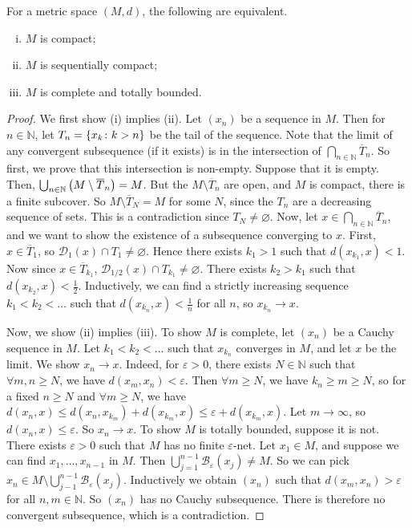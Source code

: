 \begin{theorem}
	For a metric space \( (M, d) \), the following are equivalent.
	\begin{enumerate}[(i)]
		\item \( M \) is compact;
		\item \( M \) is sequentially compact;
		\item \( M \) is complete and totally bounded.
	\end{enumerate}
\end{theorem}
\begin{proof}
	We first show (i) implies (ii).
	Let \( (x_n) \) be a sequence in \( M \).
	Then for \( n \in \mathbb N \), let \( T_n = \qty{x_k \colon k > n} \) be the tail of the sequence.
	Note that the limit of any convergent subsequence (if it exists) is in the intersection of \( \bigcap_{n \in \mathbb N} \overline T_n \).
	So first, we prove that this intersection is non-empty.
	Suppose that it is empty.
	Then, \( \bigcup_{n \in \mathbb N} \qty(M \setminus \overline T_n) = M \).
	But the \( M \setminus \overline T_n \) are open, and \( M \) is compact, there is a finite subcover.
	So \( M \setminus \overline T_N = M \) for some \( N \), since the \( T_n \) are a decreasing sequence of sets.
	This is a contradiction since \( T_N \neq \varnothing \).
	Now, let \( x \in \bigcap_{n \in \mathbb N} \overline T_n \), and we want to show the existence of a subsequence converging to \( x \).
	First, \( x \in \overline T_1 \), so \( \mathcal D_1(x) \cap T_1 \neq \varnothing \).
	Hence there exists \( k_1 > 1 \) such that \( d(x_{k_1}, x) < 1 \).
	Now since \( x \in \overline T_{k_1} \), \( \mathcal D_{1/2}(x) \cap T_{k_1} \neq \varnothing \).
	There exists \( k_2 > k_1 \) such that \( d(x_{k_2}, x) < \frac{1}{2} \).
	Inductively, we can find a strictly increasing sequence \( k_1 < k_2 < \dots \) such that \( d(x_{k_n}, x) < \frac{1}{n} \) for all \( n \), so \( x_{k_n} \to x \).

	Now, we show (ii) implies (iii).
	To show \( M \) is complete, let \( (x_n) \) be a Cauchy sequence in \( M \).
	Let \( k_1 < k_2 < \dots \) such that \( x_{k_n} \) converges in \( M \), and let \( x \) be the limit.
	We show \( x_n \to x \).
	Indeed, for \( \varepsilon > 0 \), there exists \( N \in \mathbb N \) such that \( \forall m, n \geq N \), we have \( d(x_m, x_n) < \varepsilon \).
	Then \( \forall m \geq N \), we have \( k_n \geq m \geq N \), so for a fixed \( n \geq N \) and \( \forall m \geq N \), we have \( d(x_n, x) \leq d(x_n, x_{k_m}) + d(x_{k_m}, x) \leq \varepsilon + d(x_{k_m}, x) \).
	Let \( m \to \infty \), so \( d(x_n, x) \leq \varepsilon \).
	So \( x_n \to x \).
	To show \( M \) is totally bounded, suppose it is not.
	There exists \( \varepsilon > 0 \) such that \( M \) has no finite \( \varepsilon \)-net.
	Let \( x_1 \in M \), and suppose we can find \( x_1, \dots, x_{n-1} \) in \( M \).
	Then \( \bigcup_{j=1}^{n-1} \mathcal B_\varepsilon(x_j) \neq M \).
	So we can pick \( x_n \in M \setminus \bigcup_{j-1}^{n-1} \mathcal B_\varepsilon(x_j) \).
	Inductively we obtain \( (x_n) \) such that \( d(x_m, x_n) > \varepsilon \) for all \( n, m \in \mathbb N \).
	So \( (x_n) \) has no Cauchy subsequence.
	There is therefore no convergent subsequence, which is a contradiction.


\end{proof}
